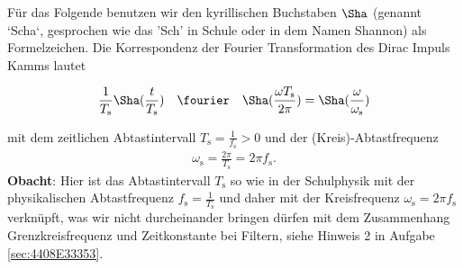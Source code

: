 Für das Folgende benutzen wir den kyrillischen Buchstaben $\Sha$ (genannt `Scha`,
gesprochen wie das 'Sch' in Schule oder in dem Namen Shannon) als Formelzeichen.
%
Die Korrespondenz der Fourier Transformation des Dirac Impuls Kamms lautet
\begin{mdframed}
\begin{equation}
\frac{1}{T_\mathrm{s}} {\Sha}(\frac{t}{T_\mathrm{s}}) \quad\fourier\quad
{\Sha}(\frac{\omega T_\mathrm{s}}{2 \pi}) =
\Sha(\frac{\omega}{\omega_\mathrm{s}})
\end{equation}
\end{mdframed}
mit dem zeitlichen Abtastintervall $T_\mathrm{s} = \frac{1}{f_\mathrm{s}}>0$
und der (Kreis)-Abtastfrequenz
\begin{align}
\omega_\mathrm{s} = \frac{2 \pi}{T_\mathrm{s}}  = 2 \pi f_\mathrm{s}.
\end{align}
%
\textbf{Obacht}: Hier ist das Abtastintervall $T_\mathrm{s}$ so wie in der Schulphysik
mit der physikalischen Abtastfrequenz $f_\mathrm{s} = \frac{1}{T_\mathrm{s}}$ und
daher mit der Kreisfrequenz $\omega_\mathrm{s}=2 \pi f_\mathrm{s}$ verknüpft,
was wir nicht durcheinander bringen dürfen mit dem Zusammenhang Grenzkreisfrequenz
und Zeitkonstante bei Filtern, siehe Hinweis 2 in Aufgabe \ref{sec:4408E33353}.


